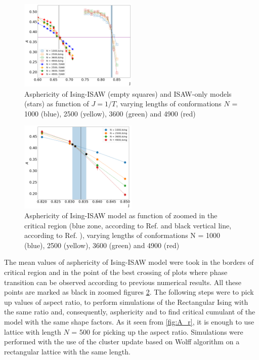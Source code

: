 \begin{figure}[h!]
        \includegraphics[width=0.5\textwidth]{Images/Ising_ISAW_A_J_Full.png}
        \caption{Asphericity of Ising-ISAW (empty squares) and ISAW-only models (stars) as function of $J=1/T$, varying lengths of conformations $N$ = 1000 (blue), 2500 (yellow), 3600 (green) and 4900 (red)}
        \label{fig:Ising&ISAW_A_J}
\end{figure}
\begin{figure}[h!]
        \includegraphics[width=0.5\textwidth]{Images/Ising_A_J_Close.png}
        \caption{Asphericity of Ising-ISAW model as function of zoomed in the critical region (blue zone, according to Ref. \cite{Foster2021} and black vertical line, according to Ref. \cite{faizullina2021critical}), varying lengths of conformations N = 1000 (blue), 2500 (yellow), 3600 (green) and 4900 (red)}
        \label{fig:Ising_A_J}
\end{figure}


The mean values of asphericity of Ising-ISAW model were took in the borders of critical region and in the point of the best crossing of plots where phase transition can be observed according to previous numerical results. All these points are marked as black in zoomed figures \ref{fig:Ising_A_J}. The following steps were to pick up values of aspect ratio, to perform simulations of the Rectangular Ising with the same ratio and, consequently, asphericity and to find critical cumulant of the model with the same shape factors. As it seen from \cref{fig:A_r}, it is enough to use lattice with length $N$ = 500 for picking up the aspect ratio. Simulations were performed with the use of the cluster update based on Wolff algorithm \cite{Newmanb1999} on a rectangular lattice with the same length.\\

